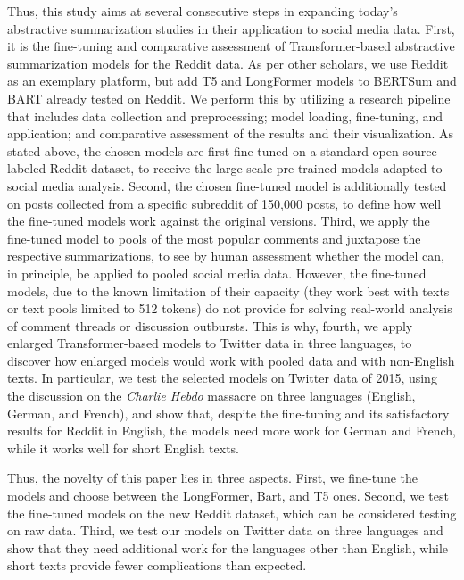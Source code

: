 Thus, this study aims at several consecutive steps in expanding today’s abstractive summarization studies in their application to social media data. First, it is the fine-tuning and comparative assessment of Transformer-based abstractive summarization models for the Reddit data. As per other scholars, we use Reddit as an exemplary platform, but add T5 and LongFormer models to BERTSum and BART already tested on Reddit. We perform this by utilizing a research pipeline that includes data collection and preprocessing; model loading, fine-tuning, and application; and comparative assessment of the results and their visualization. As stated above, the chosen models are first fine-tuned on a standard open-source-labeled Reddit dataset, to receive the large-scale pre-trained models adapted to social media analysis. Second, the chosen fine-tuned model is additionally tested on posts collected from a specific subreddit of 150,000 posts, to define how well the fine-tuned models work against the original versions. Third, we apply the fine-tuned model to pools of the most popular comments and juxtapose the respective summarizations, to see by human assessment whether the model can, in principle, be applied to pooled social media data. However, the fine-tuned models, due to the known limitation of their capacity (they work best with texts or text pools limited to 512 tokens) do not provide for solving real-world analysis of comment threads or discussion outbursts. This is why, fourth, we apply enlarged Transformer-based models to Twitter data in three languages, to discover how enlarged models would work with pooled data and with non-English texts. In particular, we test the selected models on Twitter data of 2015, using the discussion on the \textit{Charlie Hebdo} massacre on three languages (English, German, and French), and show that, despite the fine-tuning and its satisfactory results for Reddit in English, the models need more work for German and French, while it works well for short English texts.

Thus, the novelty of this paper lies in three aspects. First, we fine-tune the models and choose between the LongFormer, Bart, and T5 ones. Second, we test the fine-tuned models on the new Reddit dataset, which can be considered testing on raw data. Third, we test our models on Twitter data on three languages and show that they need additional work for the languages other than English, while short texts provide fewer complications than expected.

